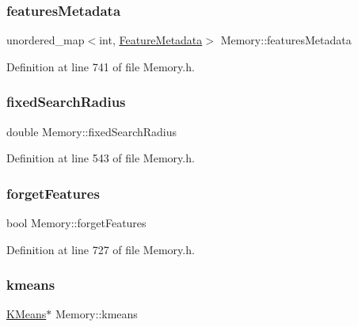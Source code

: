\subsubsection{\texorpdfstring{features\+Metadata}{featuresMetadata}}
{\footnotesize\ttfamily unordered\+\_\+map$<$int, \hyperlink{class_feature_metadata}{Feature\+Metadata}$>$ Memory\+::features\+Metadata\hspace{0.3cm}{\ttfamily [protected]}}



Definition at line 741 of file Memory.\+h.

\mbox{\label{class_memory_a65e77a8517b78627da8bc33dd5f7925b}} 
\subsubsection{\texorpdfstring{fixed\+Search\+Radius}{fixedSearchRadius}}
{\footnotesize\ttfamily double Memory\+::fixed\+Search\+Radius\hspace{0.3cm}{\ttfamily [protected]}}



Definition at line 543 of file Memory.\+h.

\mbox{\label{class_memory_ac3c18308c5e73bd2a54fcf5cb346c638}} 
\subsubsection{\texorpdfstring{forget\+Features}{forgetFeatures}}
{\footnotesize\ttfamily bool Memory\+::forget\+Features\hspace{0.3cm}{\ttfamily [protected]}}



Definition at line 727 of file Memory.\+h.

\mbox{\label{class_memory_a4d1844ac4c1ff005f5a87373783a96f1}} 
\subsubsection{\texorpdfstring{kmeans}{kmeans}}
{\footnotesize\ttfamily \hyperlink{class_k_means}{K\+Means}$\ast$ Memory\+::kmeans\hspace{0.3cm}{\ttfamily [protected]}}



